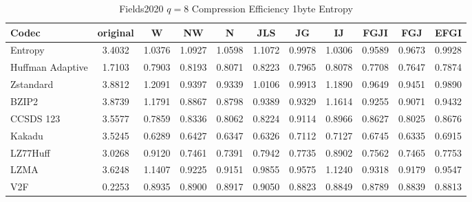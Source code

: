\documentclass{article}
\begin{document}
\begin{table}[h!]
\centering
\caption{Fields2020 $q=8$ Compression Efficiency 1byte Entropy}
\begin{tabular}{|l|cccccccccc|}
\hline
Codec &  original &      W &     NW &      N &    JLS &     JG &     IJ &   FGJI &    FGJ &   EFGI \\
\hline
Entropy & 3.4032 & 1.0376 & 1.0927 & 1.0598 & 1.1072 & 0.9978 & 1.0306 & 0.9589 & 0.9673 & 0.9928 \\
\hline
Huffman Adaptive &    1.7103 & 0.7903 & 0.8193 & 0.8071 & 0.8223 & 0.7965 & 0.8078 & 0.7708 & 0.7647 & 0.7874 \\
Zstandard        &    3.8812 & 1.2091 & 0.9397 & 0.9339 & 1.0106 & 0.9913 & 1.1890 & 0.9649 & 0.9451 & 0.9890 \\
BZIP2            &    3.8739 & 1.1791 & 0.8867 & 0.8798 & 0.9389 & 0.9329 & 1.1614 & 0.9255 & 0.9071 & 0.9432 \\
CCSDS 123        &    3.5577 & 0.7859 & 0.8336 & 0.8062 & 0.8224 & 0.9114 & 0.8966 & 0.8627 & 0.8025 & 0.8676 \\
Kakadu           &    3.5245 & 0.6289 & 0.6427 & 0.6347 & 0.6326 & 0.7112 & 0.7127 & 0.6745 & 0.6335 & 0.6915 \\
LZ77Huff         &    3.0268 & 0.9120 & 0.7461 & 0.7391 & 0.7942 & 0.7735 & 0.8902 & 0.7562 & 0.7465 & 0.7753 \\
LZMA             &    3.6248 & 1.1407 & 0.9225 & 0.9151 & 0.9855 & 0.9575 & 1.1240 & 0.9318 & 0.9179 & 0.9547 \\
V2F              &    0.2253 & 0.8935 & 0.8900 & 0.8917 & 0.9050 & 0.8823 & 0.8849 & 0.8789 & 0.8839 & 0.8813 \\
\hline
\end{tabular}
\end{table}
\end{document}
